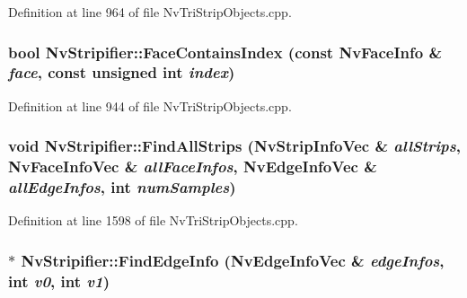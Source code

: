 Definition at line 964 of file NvTriStripObjects.cpp.\hypertarget{class_nv_stripifier_018218c73625b108fa07e5608b8982bf}{
\subsubsection[{FaceContainsIndex}]{\setlength{\rightskip}{0pt plus 5cm}bool NvStripifier::FaceContainsIndex (const {\bf NvFaceInfo} \& {\em face}, \/  const unsigned int {\em index})}}
\label{class_nv_stripifier_018218c73625b108fa07e5608b8982bf}




Definition at line 944 of file NvTriStripObjects.cpp.\hypertarget{class_nv_stripifier_d847ecb4dfa70fe5432470e0fc569472}{
\subsubsection[{FindAllStrips}]{\setlength{\rightskip}{0pt plus 5cm}void NvStripifier::FindAllStrips ({\bf NvStripInfoVec} \& {\em allStrips}, \/  {\bf NvFaceInfoVec} \& {\em allFaceInfos}, \/  {\bf NvEdgeInfoVec} \& {\em allEdgeInfos}, \/  int {\em numSamples})}}
\label{class_nv_stripifier_d847ecb4dfa70fe5432470e0fc569472}




Definition at line 1598 of file NvTriStripObjects.cpp.\hypertarget{class_nv_stripifier_c2d08361cafc6f73b8160d82c1305441}{
\subsubsection[{FindEdgeInfo}]{ $\ast$ NvStripifier::FindEdgeInfo ({\bf NvEdgeInfoVec} \& {\em edgeInfos}, \/  int {\em v0}, \/  int {\em v1})}}
\label{class_nv_stripifier_c2d08361cafc6f73b8160d82c1305441}




